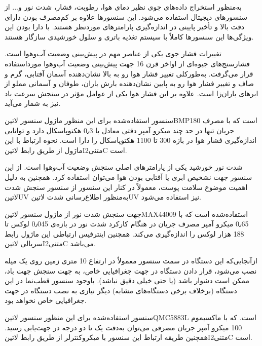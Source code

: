 
به‌منظور استخراج داده‌های جوی نظیر دمای هوا، رطوبت، فشار، شدت نور و... از سنسورهای دیجیتال استفاده می‌شود. این سنسورها علاوه بر کم‌مصرف بودن دارای دقت بالا و تأخیر پایینی در اندازه‌گیری پارامترهای موردنظر هستند. با دارا بودن این ویژگی‌ها این سنسورها کاملاً با سیستم تغذیه باتری و سلول خورشیدی سازگار هستند.


تغییرات فشار جوی یکی از عناصر مهم در پیش‌بینی وضعیت آب‌وهوا است. فشارسنج‌های جیوه‌ای از اواخر قرن 16 جهت پیش‌بینی وضعیت آب‌وهوا مورداستفاده قرار می‌گرفت. به‌طورکلی تغییر فشار هوا رو به بالا نشان‌دهنده آسمان آفتابی، گرم و صاف و تغییر فشار هوا رو به پایین نشان‌دهنده بارش باران، طوفان و آسمانی مملو از ابرهای باران‌زا است. علاوه بر این فشار هوا یکی از عوامل مؤثر در سنجش سرعت باد نیز به شمار می‌آید. 

سنسور استفاده‌شده برای این منظور ماژول سنسور ‌لاتین{BMP180} است که با مصرف جریان تنها در حد چند میکرو آمپر دقتی معادل با 0٫3 هکتوپاسکال دارد و توانایی اندازه‌گیری فشار هوا در بازه 300 تا 1100 هکتوپاسکال را دارا است. نحوه ارتباط با این ماژول از طریق رابط ‌لاتین{I‌متنی{2}C} است. 


شدت نور خورشید یکی از پارامترهای اصلی سنجش وضعیت آب‌وهوا است. از این سنسور جهت نشخیص ابری یا آفتابی بودن هوا می‌توان استفاده کرد. همچنین به دلیل اهمیت موضوع سلامت پوست، معمولاً در کنار این سنسور از سنسور سنجش شدت ‌لاتین{UV} به‌منظور اطلاع‌رسانی شدت ‌لاتین{UV} نیز استفاده می‌شود. 

جهت سنجش شدت نور از ماژول سنسور ‌لاتین{MAX44009} استفاده‌شده است که با 0٫65 میکرو آمپر مصرف جریان در هنگام کارکرد شدت نور در بازه‌ی 0٫045 لوکس تا 188 هزار لوکس را اندازه‌گیری می‌کند. همچنین اینترفیس ارتباطی این ماژول رابط سریالی ‌لاتین{I‌متنی{2}C} می‌باشد.


ازآنجایی‌که این دستگاه در سمت سنسور معمولاً در ارتفاع 10 متری زمین روی یک میله نصب می‌شود، قرار دادن دستگاه در جهت جغرافیایی خاص، به جهت سنجش جهت باد، ممکن است دشوار باشد (یا حتی خیلی دقیق نباشد). باوجود سنسور قطب‌نما در این دستگاه (برخلاف برخی دستگاه‌های مشابه) دیگر نیازی به نصب دستگاه در جهت جغرافیایی خاص نخواهد بود.

سنسور استفاده‌شده برای این منظور سنسور ‌لاتین{QMC5883L} است. که با ماکسیموم 100 میکرو آمپر جریان مصرفی می‌توان به‌دقت یک تا دو درجه در جهت‌یابی رسید. همچنین طریقه ارتباط این سنسور با میکروکنترلر از طریق رابط ‌لاتین{I‌متنی{2}C} است.

